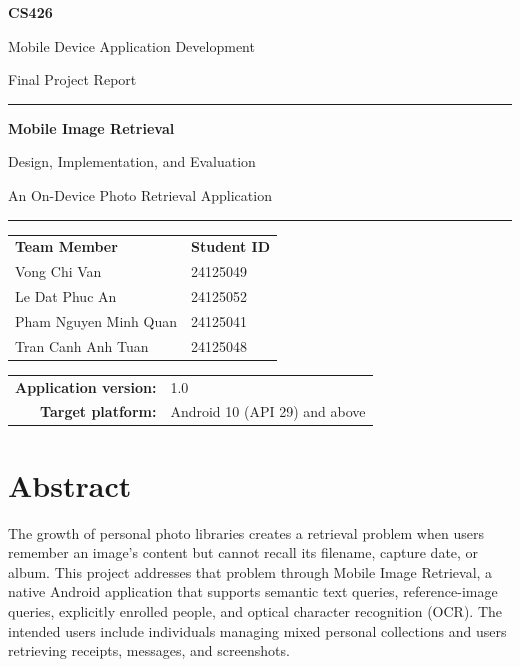 \documentclass[11pt,a4paper]{article}
\newcommand{\CourseCode}{CS426}
\newcommand{\CourseTitle}{Mobile Device Application Development}
\newcommand{\TeamMembers}{%
  \begin{tabular}{ll}
  \textbf{Team Member} & \textbf{Student ID}\\[5pt]
  Vong Chi Van & 24125049\\[3pt]
  Le Dat Phuc An & 24125052\\[3pt]
  Pham Nguyen Minh Quan & 24125041\\[3pt]
  Tran Canh Anh Tuan & 24125048
  \end{tabular}%
}
\begin{document}
\hypersetup{pageanchor=false}
\begin{titlepage}
\thispagestyle{empty}
\centering
\vspace*{12mm}
{\large\bfseries\CourseCode\par}
\vspace{3mm}
{\large\CourseTitle\par}
\vspace{5mm}
{\large Final Project Report\par}
\vspace{22mm}
\rule{0.82\textwidth}{0.5pt}\par
\vspace{8mm}
{\fontsize{28}{34}\selectfont\bfseries Mobile Image Retrieval\par}
\vspace{6mm}
{\Large Design, Implementation, and Evaluation\par}
\vspace{3mm}
{\large An On-Device Photo Retrieval Application\par}
\vspace{8mm}
\rule{0.82\textwidth}{0.5pt}\par
\vfill
{\normalsize\TeamMembers\par}
\vspace{5mm}
\vspace{15mm}
\begin{tabular}{rl}
\textbf{Application version:} & 1.0\\[4pt]
\textbf{Target platform:} & Android 10 (API 29) and above\\[4pt]
\end{tabular}
\vspace*{12mm}
\end{titlepage}
\hypersetup{pageanchor=true}
\section*{Abstract}

The growth of personal photo libraries creates a retrieval problem when users remember an image's content but cannot recall its filename, capture date, or album. This project addresses that problem through Mobile Image Retrieval, a native Android application that supports semantic text queries, reference-image queries, explicitly enrolled people, and optical character recognition (OCR). The intended users include individuals managing mixed personal collections and users retrieving receipts, messages, and screenshots.
\end{document}
